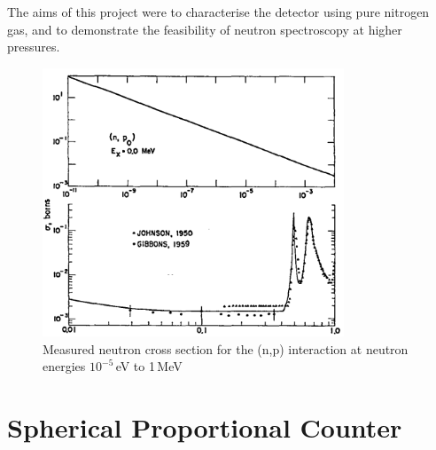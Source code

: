 \documentclass[a4paper]{article}
\begin{document}
\newline The aims of this project were to characterise the detector using pure nitrogen gas, and to demonstrate the feasibility of neutron spectroscopy at higher pressures.
\begin{figure}[H]
    \centering
    \includegraphics[height=8cm]{plots/Crosssection.png}
    \caption{Measured neutron cross section for the (n,p) interaction at neutron energies $10^{-5}$\,eV to 1\,MeV \cite{young_foster_1972}}
    \label{fig:cross}
\end{figure}
\newpage
\section{Spherical Proportional Counter}
\end{document}
